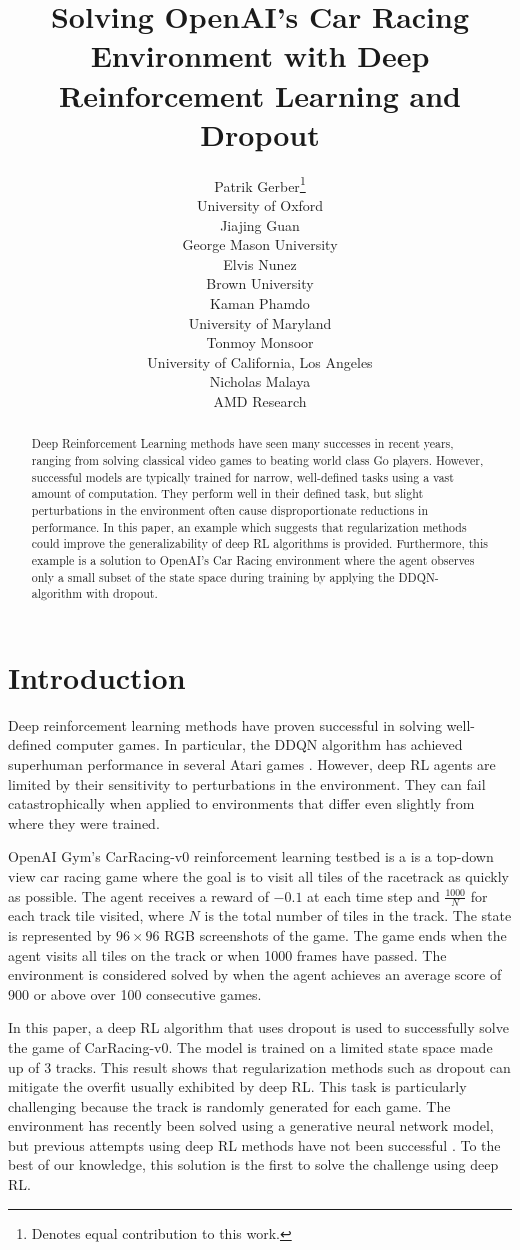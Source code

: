 \documentclass{article}
\title{Solving OpenAI's Car Racing Environment with Deep Reinforcement Learning and Dropout}
\author{
  Patrik Gerber\thanks{Denotes equal contribution to this work.}\\
  University of Oxford \\
  \And
  Jiajing Guan\samethanks \\
  George Mason University \\ 
  \And
  Elvis Nunez\samethanks \\
  Brown University \\
  \And
  Kaman Phamdo\samethanks \\
  University of Maryland \\
  \And
  Tonmoy Monsoor \\
  University of California, Los Angeles \\
  \And
  Nicholas Malaya \\ %
  AMD Research \\ 
}
\begin{document}

\maketitle

\begin{abstract}
Deep Reinforcement Learning methods have seen many successes in recent
years, ranging from solving classical video games to beating world
class Go players. However, successful models are typically trained for
narrow, well-defined tasks using a vast amount of computation. They
perform well in their defined task, but slight perturbations in the
environment often cause disproportionate reductions in performance. In
this paper, an example which suggests that regularization
methods could improve the generalizability of deep RL algorithms is
provided.
Furthermore, this example is a solution to OpenAI’s Car
Racing environment where the agent observes only a small subset of the
state space during training by applying the DDQN-algorithm with dropout. 
\end{abstract}

\vspace{-6mm}
\section{Introduction}
Deep reinforcement learning methods have proven successful in solving
well-defined computer games. In particular, the DDQN algorithm has
achieved superhuman performance in several Atari games
\cite{DQN}. However, deep RL agents are limited by their sensitivity
to perturbations in the environment. They can fail catastrophically
when applied to environments that differ even slightly from where they
were trained. 

OpenAI Gym’s CarRacing-v0 reinforcement learning testbed
\cite{CarRacing} is a is a top-down view car racing game where the
goal is to visit all tiles of the racetrack as quickly as
possible. The agent receives a reward of $-0.1$ at each time step and
$\frac{1000}{N}$ for each track tile visited, where $N$ is the total
number of tiles in the track. The state is represented by $96\times96$
RGB screenshots of the game. The game ends when the agent visits all
tiles on the track or when 1000 frames have passed. The environment is
considered solved by when the agent achieves an average score of 900
or above over 100 consecutive games. 

In this paper, a deep RL algorithm that uses dropout
\cite{Dropout} is used to successfully solve the game of
CarRacing-v0.
The model is trained on a limited state space made up of 3
tracks. This result
shows that regularization methods such as dropout can mitigate the
overfit usually exhibited by deep RL. This task is particularly
challenging because the track is randomly generated for each game. The
environment has recently been solved using a generative neural network
model, but previous attempts using deep RL methods have not been
successful \cite{World_Models} \cite{CarRacing1}. To the best of our
knowledge, this solution is the first to solve the challenge using
deep RL. 
\end{document}
